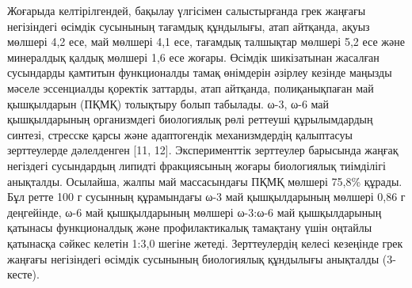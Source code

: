 \begin{multicols}{2}
Жоғарыда келтірілгендей, бақылау үлгісімен салыстырғанда грек жаңғағы
негізіндегі өсімдік сусынының тағамдық құндылығы, атап айтқанда, ақуыз
мөлшері 4,2 есе, май мөлшері 4,1 есе, тағамдық талшықтар мөлшері 5,2 есе
және минералдық қалдық мөлшері 1,6 есе жоғары. Өсімдік шикізатынан
жасалған сусындарды қамтитын функционалды тамақ өнімдерін әзірлеу
кезінде маңызды мәселе эссенциалды қоректік заттарды, атап айтқанда,
полиқанықпаған май қышқылдарын (ПҚМҚ) толықтыру болып табылады. ω-3, ω-6
май қышқылдарының организмдегі биологиялық рөлі реттеуші құрылымдардың
синтезі, стресске қарсы және адаптогендік механизмдердің қалыптасуы
зерттеулерде дәлелденген {[}11, 12{]}. Эксперименттік зерттеулер
барысында жаңғақ негіздегі сусындардың липидті фракциясының жоғары
биологиялық тиімділігі анықталды. Осылайша, жалпы май массасындағы ПҚМҚ
мөлшері 75,8\% құрады. Бұл ретте 100 г сусынның құрамындағы ω-3 май
қышқылдарының мөлшері 0,86 г деңгейінде, ω-6 май қышқылдарының мөлшері
ω-3:ω-6 май қышқылдарының қатынасы функционалдық және профилактикалық
тамақтану үшін оңтайлы қатынасқа сәйкес келетін 1:3,0 шегіне жетеді.
Зерттеулердің келесі кезеңінде грек жаңғағы негізіндегі өсімдік
сусынының биологиялық құндылығы анықталды (3-кесте).
\end{multicols}

\begin{table}[H]
\caption*{3-кесте - Грек жаңғағы негізіндегі өсімдік сусынының биологиялық құндылығы}
\centering
{}
\end{table}


